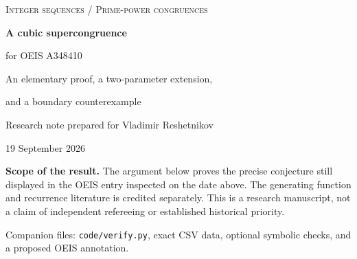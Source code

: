 \documentclass[11pt,a4paper]{article}
\numberwithin{equation}{section}
\theoremstyle{definition}
\theoremstyle{remark}
\begin{document}
\thispagestyle{empty}
\begin{center}
{\small\scshape\color{OliveInk} Integer sequences \quad / \quad Prime-power congruences}\par
\vspace{1.2em}
{\LARGE\bfseries A cubic supercongruence\par for OEIS A348410}\par
\vspace{0.8em}
{\large An elementary proof, a two-parameter extension,\par and a boundary counterexample}\par
\vspace{1.0em}
{\normalsize Research note prepared for Vladimir Reshetnikov}\par
{\small 19 September 2026}\par
\end{center}
\vspace{0.7em}
\begin{abstract}
Let $a(0)=1$ and
\[
 a(n)=[x^n]\bigl((1-x)(1-x^2)\bigr)^{-n}.
\]
We give a self-contained proof of the conjecture recorded by Peter Bala in
OEIS A348410: for every prime $p\geq5$ and all positive integers $m,r$,
\[
 a(mp^r)\equiv a(mp^{r-1})\pmod{p^{3r}}.
\]
In fact, the same congruence holds for
$A_{u,v}(n)=[x^n](1-x)^{-un}(1+x)^{-vn}$ with arbitrary integers $u,v$.
At $p=3$, the uniform exponent becomes $3r-1$; its loss of one power is
necessary already for the original sequence. The proof splits a formal
logarithm into degrees divisible and not divisible by $p$. After an
exponential truncation, only a quadratic coefficient can matter. Its
extra divisibility follows from a reciprocal-square sum and a parity
identity; a logarithmic-derivative estimate then completes the argument
at every prime-power level. We also derive a denominator restriction for
the cubic M\"obius transform and exhibit a period-three replacement that
fails modulo $5^3$. A separate source audit explains why a broader printed
framing claim is not used. Exact-arithmetic programs, test data, and
symbolic generating-function certificates accompany the note.
\end{abstract}
\begin{tcolorbox}[colback=SoftOlive,colframe=RuleGray,boxrule=0.4pt,arc=1mm,
  left=2mm,right=2mm,top=1.2mm,bottom=1.2mm]
\small\textbf{Scope of the result.}
The argument below proves the precise conjecture still displayed in the
OEIS entry inspected on the date above. The generating function and
recurrence literature is credited separately. This is a research
manuscript, not a claim of independent refereeing or established
historical priority.
\end{tcolorbox}
\vfill
{\small\color{WarmGray}Companion files: \texttt{code/verify.py}, exact CSV data,
optional symbolic checks, and a proposed OEIS annotation.}
\newpage
\tableofcontents
\vspace{1.0em}
\end{document}
